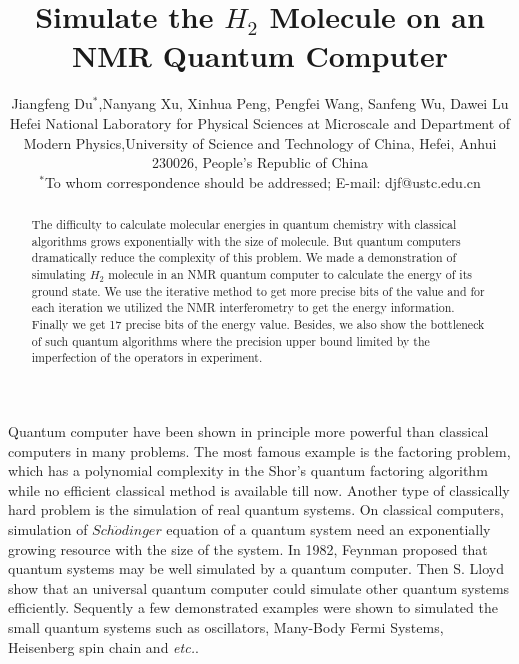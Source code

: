 \documentclass[twocolumn,showpacs,twoside,10pt,superscriptaddress,prl]{revtex4}
\begin{document}
\title{Simulate the $H_2$ Molecule on an NMR Quantum Computer}
\author{Jiangfeng Du$^{\ast}$,Nanyang Xu, Xinhua Peng, Pengfei Wang, Sanfeng Wu, Dawei Lu \\
\normalsize{Hefei National Laboratory for Physical Sciences at
Microscale and Department of Modern
Physics,University of Science and Technology of China, Hefei, Anhui 230026, People's Republic of China}\\
\normalsize{$^\ast$To whom correspondence should be addressed;
E-mail:  djf@ustc.edu.cn}}



\begin{abstract}
The difficulty to calculate molecular energies in quantum chemistry
with classical algorithms grows exponentially with the size of
molecule. But quantum computers dramatically reduce the complexity
of this problem. We made a demonstration of simulating $H_2$
molecule in an NMR quantum computer to calculate the energy of its
ground state. We use the iterative method to get more precise bits
of the value and for each iteration we utilized the NMR
interferometry to get the energy information. Finally we get 17
precise bits of the energy value. Besides, we also show the
bottleneck of such quantum algorithms where the precision upper
bound limited by the imperfection of the operators in experiment.

\end{abstract}
\maketitle

Quantum computer have been shown in principle more powerful than
classical computers in many problems. The most famous example is the
factoring problem, which has a polynomial complexity in the Shor's
quantum factoring algorithm\cite{shor_algorithm} while no efficient
classical method is available till now\cite{knuth}. Another type of
classically hard problem is the simulation of real quantum
systems\cite{lloyld_univsim}. On classical computers, simulation of
$Sch\ddot{o}dinger$ equation of a quantum system need an
exponentially growing resource with the size of the system. In 1982,
Feynman proposed that quantum systems may be well simulated by a
quantum computer\cite{feynman}. Then S. Lloyd show that an universal
quantum computer could simulate other quantum systems efficiently.
Sequently a few demonstrated examples were shown to simulated the
small quantum systems such as oscillators\cite{oscillator},
Many-Body Fermi Systems\cite{manybody}, Heisenberg spin
chain\cite{peng2005} and \emph{etc.}.
\end{document}
